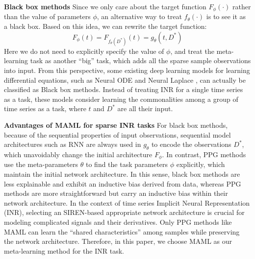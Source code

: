 \documentclass{article}
\begin{document}
\textbf{Black box methods}
Since we only care about the target function $F_\phi(\cdot)$ rather than the value of parameters $\phi$, an alternative way to treat $f_\theta(\cdot)$ is to see it as a black box. Based on this idea, we can rewrite the target function:
$$
F_\phi(t)=F_{f_\theta(D^*)}(t)=g_\theta(t,D^*)
$$
Here we do not need to explicitly specify the value of $\phi$, and treat the meta-learning task as another ``big'' task, which adds all the sparse sample observations into input.
  From this perspective, some existing deep learning models for learning differential equations, 
  such as Neural ODE \cite{chen2018neural} and Neural Laplace \cite{holt2022neural}, 
  can actually be classified as Black box methods. 
  Instead of treating INR for a single time series as a task, 
  these models consider learning the commonalities among a group of time series as a task, where $t$ and $D^*$ are all their input.


\textbf{Advantages of MAML for sparse INR tasks}
For black box methods, because of the sequential properties of input observations, sequential model architectures such as RNN are always used in $g_\theta$ to encode the observations $D^*$, which unavoidably change the initial architecture $F_\phi$.
In contrast, PPG methods use the meta-parameters $\theta$ to find the task parameters $\phi$ explicitly, which maintain the initial network architecture.
In this sense, black box methods are less explainable and exhibit an inductive bias derived from data, 
whereas PPG methods are more straightforward but carry an inductive bias within their network architecture.
In the context of time series Implicit Neural Representation (INR), selecting an SIREN-based appropriate network architecture is crucial for modeling complicated signals and their derivatives.
Only PPG methods like MAML can learn the ``shared characteristics'' among samples while preserving the network architecture.
Therefore, in this paper, we choose MAML as our meta-learning method for the INR task.
\end{document}
